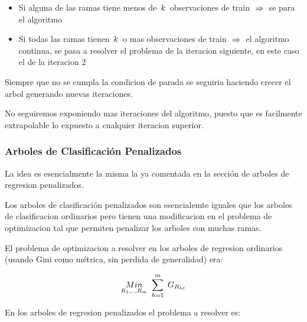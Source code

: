 \documentclass[
  11pt,
  a4paper,
]{article}
\begin{document}
\begin{itemize}
\item
  Si alguna de las ramas tiene menos de
  \(\hspace{0.05cm}k\hspace{0.05cm}\) observaciones de train
  \(\hspace{0.1cm} \Rightarrow \hspace{0.1cm}\) se para el algoritmo
\item
  Si todas las ramas tienen \(\hspace{0.05cm}k\hspace{0.05cm}\) o mas
  observaciones de train \(\hspace{0.1cm} \Rightarrow \hspace{0.1cm}\)
  el algoritmo continua, se pasa a resolver el problema de la iteracion
  siguiente, en este caso el de la iteracion 2
\end{itemize}

Siempre que no se cumpla la condicion de parada se seguiria haciendo
crecer el arbol generando nuevas iteraciones.

No seguiremos exponiendo mas iteraciones del algoritmo, puesto que es
facilmente extrapolable lo expuesto a cualquier iteracion superior.

\newpage

\hypertarget{arboles-de-clasificaciuxf3n-penalizados}{%
\subsubsection{Arboles de Clasificación
Penalizados}\label{arboles-de-clasificaciuxf3n-penalizados}}

La idea es esencialmente la misma la ya comentada en la sección de
arboles de regresion penalizados.

Los arboles de clasificación penalizados son esencialemte iguales que
los arboles de clasificacion ordinarios pero tienen una modificacion en
el problema de optimizacion tal que permiten penalizar los arboles con
muchas ramas.

El problema de optimizacion a resolver en los arboles de regresion
ordinarios (usando Gini como métrica, sin perdida de generalidad) era:

\[ \underset{R_1,..,R_m}{Min}  \hspace{0.12cm}  \sum_{h=1}^{m} \hspace{0.1cm} G_{R_{ht}}  \]

En los arboles de regresion penalizados el problema a resolver es:
\end{document}
